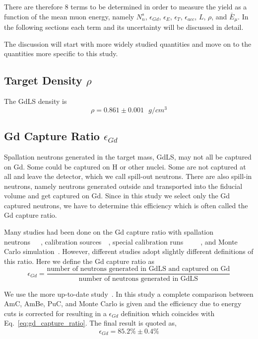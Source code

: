 There are therefore 8 terms to be determined in order to measure the yield as a function of the mean muon energy, namely $N_n^s$, $\epsilon_{Gd}$, $\epsilon_E$, $\epsilon_T$, $\epsilon_{acc}$, $L$, $\rho$, and $\bar{E}_\mu$. In the following sections each term and its uncertainty will be discussed in detail.

The discussion will start with more widely studied quantities and move on to the quantities more specific to this study.

\subsection{Target Density \texorpdfstring{$\rho$}{rho}}
The GdLS density is~\cite{docdb6615}
\begin{equation}
	\rho=0.861\pm 0.001\text{ }g/cm^3
\end{equation}

\subsection{Gd Capture Ratio \texorpdfstring{$\epsilon_{Gd}$}{epsilon Gd}}
Spallation neutrons generated in the target mass, GdLS, may not all be captured on Gd. Some could be captured on H or other nuclei. Some are not captured at all and leave the detector, which we call spill-out neutrons. There are also spill-in neutrons, namely neutrons generated outside and transported into the fiducial volume and get captured on Gd. Since in this study we select only the Gd captured neutrons, we have to determine this efficiency which is often called the Gd capture ratio.

Many studies had been done on the Gd capture ratio with spallation neutrons~\cite{docdb7273}~\cite{docdb7524}~\cite{docdb7525}, calibration sources~\cite{docdb7273}~\cite{docdb7525}, special calibration runs~\cite{docdb8280}~\cite{docdb8473}~\cite{docdb8501}~\cite{docdb9226}~\cite{docdb9273}, and Monte Carlo simulation~\cite{docdb7730}. However, different studies adopt slightly different definitions of this ratio. Here we define the Gd capture ratio as
\begin{equation} \label{eq:gd_capture_ratio}
	\epsilon_{Gd}=\frac{\text{number of neutrons generated in GdLS and captured on Gd}}{\text{number of neutrons generated in GdLS}}
\end{equation}

We use the more up-to-date study~\cite{docdb9273}. In this study a complete comparison between AmC, AmBe, PuC, and Monte Carlo is given and the efficiency due to energy cuts is corrected for resulting in a $\epsilon_{Gd}$ definition which coincides with Eq.~\ref{eq:gd_capture_ratio}. The final result is quoted as,
\begin{equation}
  \epsilon_{Gd}=85.2\%\pm 0.4\%
\end{equation}


